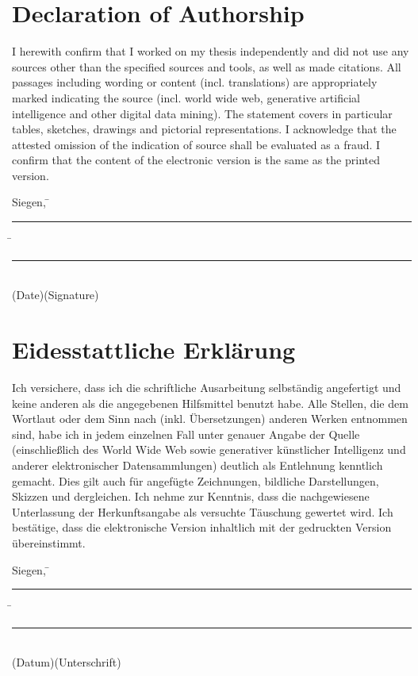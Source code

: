 
\ifenglish
\chapter*{Declaration of Authorship}
\thispagestyle{empty}

I herewith confirm that I worked on my thesis independently and did not use any sources other than the specified sources and tools, as well as made citations. All passages including wording or content (incl. translations) are appropriately marked indicating the source (incl. world wide web, generative artificial intelligence and other digital data mining). The statement covers in particular tables, sketches, drawings and pictorial representations. I acknowledge that the attested omission of the indication of source shall be evaluated as a fraud. I confirm that the content of the electronic version is the same as the printed version.\\[8ex]


\begin{tabbing}
Siegen, \hspace{0.4cm} \= \rule[-0.15\baselineskip]{5cm}{.4pt}  \hspace{0.7cm}\= \rule[-0.15\baselineskip]{6cm}{.4pt}\\
\renewcommand{\baselinestretch}{0.5}\normalsize
\>\small{(Date)}\>\small{(Signature)}
\end{tabbing}
\renewcommand{\baselinestretch}{1}\normalsize
\fi

\ifdeutsch
\chapter*{Eidesstattliche Erklärung}
\thispagestyle{empty}

Ich versichere, dass ich die schriftliche Ausarbeitung selbständig angefertigt und keine anderen als die angegebenen Hilfsmittel benutzt habe. Alle Stellen, die dem Wortlaut oder dem Sinn nach (inkl. Übersetzungen) anderen Werken entnommen sind, habe ich in jedem einzelnen Fall unter genauer Angabe der Quelle (einschließlich des World Wide Web sowie generativer künstlicher Intelligenz und anderer elektronischer Datensammlungen) deutlich als Entlehnung kenntlich gemacht. Dies gilt auch für angefügte Zeichnungen, bildliche Darstellungen, Skizzen und dergleichen. Ich nehme zur Kenntnis, dass die nachgewiesene Unterlassung der Herkunftsangabe als versuchte Täuschung gewertet wird. Ich bestätige, dass die elektronische Version inhaltlich mit der gedruckten Version
übereinstimmt.
\\[8ex]
\begin{tabbing}
Siegen, \hspace{0.4cm} \= \rule[-0.15\baselineskip]{5cm}{.4pt}  \hspace{0.7cm}\= \rule[-0.15\baselineskip]{6cm}{.4pt}\\
\renewcommand{\baselinestretch}{0.5}\normalsize
\>\small{(Datum)}\>\small{(Unterschrift)}
\end{tabbing}
\renewcommand{\baselinestretch}{1}\normalsize
\fi